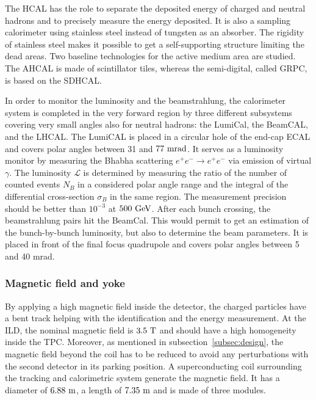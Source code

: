       The \gls{HCAL} has the role to separate the deposited energy of charged and neutral hadrons and to precisely measure the energy deposited.
      It is also a sampling calorimeter using stainless steel instead of tungsten as an absorber. 
      The rigidity of stainless steel makes it possible to get a self-supporting structure limiting the dead areas.
      Two baseline technologies for the active medium area are studied.
      The  \gls{AHCAL} is made of scintillator tiles, whereas the semi-digital, called \gls{GRPC}, is based on the \gls{SDHCAL}.

      In order to monitor the luminosity and the beamstrahlung, the calorimeter system is completed in the very forward region by three different subsystems covering very small angles also for neutral hadrons: the LumiCal, the BeamCAL, and the \gls{LHCAL}.
      The LumiCAL is placed in a circular hole of the end-cap \gls{ECAL} and covers polar angles between 31 and $77~\rm{mrad}$. 
      It serves as a luminosity monitor by measuring the Bhabha scattering $e^+e^- \rightarrow e^+e^-$ via emission of virtual $\gamma$.
      The luminosity $\mathcal{L}$ is determined by measuring  the ratio of the number of counted events $N_B$ in a considered polar angle range and the integral of the differential cross-section $\sigma_B$ in the same region.
      The measurement precision should be better than $10^{-3}$ at $500~\rm{GeV}$.
      After each bunch crossing, the beamstrahlung pairs hit the BeamCal.
      This would permit to get an estimation of the bunch-by-bunch luminosity, but also to determine the beam parameters.
      It is placed in front of the final focus quadrupole and covers polar angles between 5 and 40 mrad.

      \subsubsection{Magnetic field and yoke}

     By applying a high magnetic field inside the detector, the charged particles have a bent track helping with the identification and the energy measurement.
     At the \gls{ILD}, the nominal magnetic field is $3.5~\rm{T}$ and should have a high homogeneity inside the TPC.
     Moreover, as mentioned in subsection~\ref{subsec:design}, the magnetic field beyond the coil has to be reduced to avoid any perturbations with the second detector in its parking position.
     A superconducting coil surrounding the tracking and calorimetric system generate the magnetic field.
     It has a diameter of $6.88~\rm{m}$, a length of $7.35~\rm{m}$ and is made of three modules.

